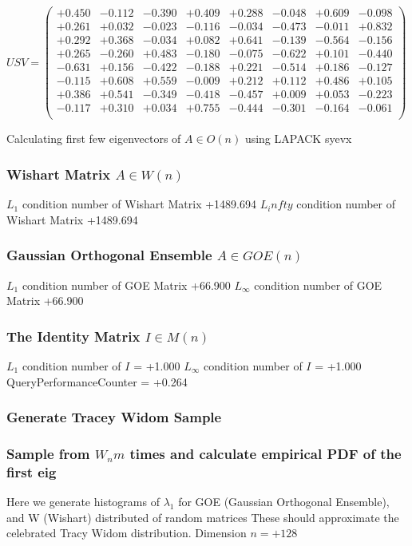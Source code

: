 \documentclass[9pt]{article}
\theoremstyle{plain}
\theoremstyle{definition}
\theoremstyle{remark}
\numberwithin{equation}{section}
\begin{document}
$U S V = \left(
\begin{array}{
cccccccc}
+0.450 & -0.112 & -0.390 & +0.409 & +0.288 & -0.048 & +0.609 & -0.098 \\
+0.261 & +0.032 & -0.023 & -0.116 & -0.034 & -0.473 & -0.011 & +0.832 \\
+0.292 & +0.368 & -0.034 & +0.082 & +0.641 & -0.139 & -0.564 & -0.156 \\
+0.265 & -0.260 & +0.483 & -0.180 & -0.075 & -0.622 & +0.101 & -0.440 \\
-0.631 & +0.156 & -0.422 & -0.188 & +0.221 & -0.514 & +0.186 & -0.127 \\
-0.115 & +0.608 & +0.559 & -0.009 & +0.212 & +0.112 & +0.486 & +0.105 \\
+0.386 & +0.541 & -0.349 & -0.418 & -0.457 & +0.009 & +0.053 & -0.223 \\
-0.117 & +0.310 & +0.034 & +0.755 & -0.444 & -0.301 & -0.164 & -0.061 \\
\end{array}
\right)$ \newline 

Calculating first few eigenvectors of $A \in O(n)$ using LAPACK syevx

\subsubsection{Wishart Matrix $A \in W(n)$}
$L_1$ condition number of Wishart Matrix +1489.694
$L_infty$ condition number of Wishart Matrix +1489.694
\subsubsection{Gaussian Orthogonal Ensemble $A \in GOE(n)$}
$L_1$ condition number of GOE Matrix +66.900
$L_\infty$ condition number of GOE Matrix +66.900
\subsubsection{The Identity Matrix $I \in M(n)$}
$L_1$ condition number of $I$ = +1.000
$L_\infty$ condition number of $I$ = +1.000
QueryPerformanceCounter  =  +0.264
\subsubsection{Generate Tracey Widom Sample}
\subsubsection{Sample from $W_n m$ times and calculate empirical PDF of the first eig}
Here we generate histograms of $\lambda_1$ for GOE (Gaussian Orthogonal Ensemble), and W (Wishart) 		 distributed of random matrices
These should approximate the celebrated Tracy Widom distribution.
Dimension $n = +128$
\end{document}
